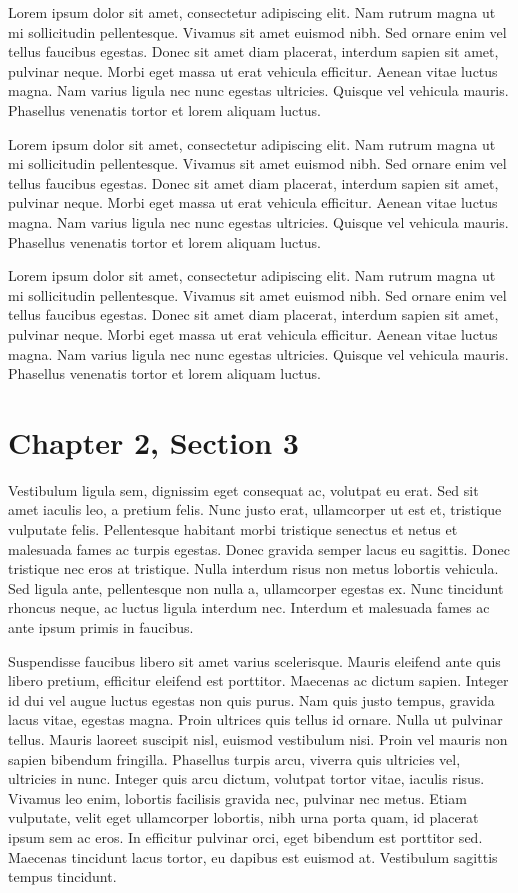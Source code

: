 Lorem ipsum dolor sit amet, consectetur adipiscing elit. Nam rutrum magna ut mi sollicitudin pellentesque. Vivamus sit amet euismod nibh. Sed ornare enim vel tellus faucibus egestas. Donec sit amet diam placerat, interdum sapien sit amet, pulvinar neque. Morbi eget massa ut erat vehicula efficitur. Aenean vitae luctus magna. Nam varius ligula nec nunc egestas ultricies. Quisque vel vehicula mauris. Phasellus venenatis tortor et lorem aliquam luctus.


Lorem ipsum dolor sit amet, consectetur adipiscing elit. Nam rutrum magna ut mi sollicitudin pellentesque. Vivamus sit amet euismod nibh. Sed ornare enim vel tellus faucibus egestas. Donec sit amet diam placerat, interdum sapien sit amet, pulvinar neque. Morbi eget massa ut erat vehicula efficitur. Aenean vitae luctus magna. Nam varius ligula nec nunc egestas ultricies. Quisque vel vehicula mauris. Phasellus venenatis tortor et lorem aliquam luctus.


Lorem ipsum dolor sit amet, consectetur adipiscing elit. Nam rutrum magna ut mi sollicitudin pellentesque. Vivamus sit amet euismod nibh. Sed ornare enim vel tellus faucibus egestas. Donec sit amet diam placerat, interdum sapien sit amet, pulvinar neque. Morbi eget massa ut erat vehicula efficitur. Aenean vitae luctus magna. Nam varius ligula nec nunc egestas ultricies. Quisque vel vehicula mauris. Phasellus venenatis tortor et lorem aliquam luctus.

\newpage

\section{Chapter 2, Section 3}

Vestibulum ligula sem, dignissim eget consequat ac, volutpat eu erat. Sed sit amet iaculis leo, a pretium felis. Nunc justo erat, ullamcorper ut est et, tristique vulputate felis. Pellentesque habitant morbi tristique senectus et netus et malesuada fames ac turpis egestas. Donec gravida semper lacus eu sagittis. Donec tristique nec eros at tristique. Nulla interdum risus non metus lobortis vehicula. Sed ligula ante, pellentesque non nulla a, ullamcorper egestas ex. Nunc tincidunt rhoncus neque, ac luctus ligula interdum nec. Interdum et malesuada fames ac ante ipsum primis in faucibus.

Suspendisse faucibus libero sit amet varius scelerisque. Mauris eleifend ante quis libero pretium, efficitur eleifend est porttitor. Maecenas ac dictum sapien. Integer id dui vel augue luctus egestas non quis purus. Nam quis justo tempus, gravida lacus vitae, egestas magna. Proin ultrices quis tellus id ornare. Nulla ut pulvinar tellus. Mauris laoreet suscipit nisl, euismod vestibulum nisi. Proin vel mauris non sapien bibendum fringilla. Phasellus turpis arcu, viverra quis ultricies vel, ultricies in nunc. Integer quis arcu dictum, volutpat tortor vitae, iaculis risus. Vivamus leo enim, lobortis facilisis gravida nec, pulvinar nec metus. Etiam vulputate, velit eget ullamcorper lobortis, nibh urna porta quam, id placerat ipsum sem ac eros. In efficitur pulvinar orci, eget bibendum est porttitor sed. Maecenas tincidunt lacus tortor, eu dapibus est euismod at. Vestibulum sagittis tempus tincidunt. 


